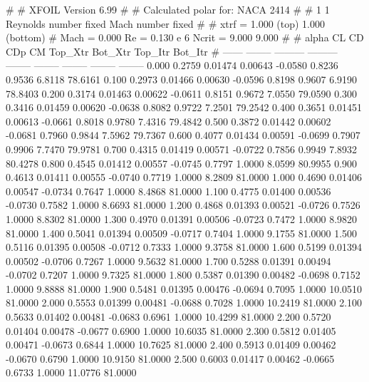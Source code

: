 #  
#       XFOIL         Version 6.99
#  
# Calculated polar for: NACA 2414                                       
#  
# 1 1 Reynolds number fixed          Mach number fixed         
#  
# xtrf =   1.000 (top)        1.000 (bottom)  
# Mach =   0.000     Re =     0.130 e 6     Ncrit =   9.000  9.000
#  
#   alpha    CL        CD       CDp       CM     Top_Xtr  Bot_Xtr  Top_Itr  Bot_Itr
#  ------ -------- --------- --------- -------- -------- -------- -------- --------
   0.000   0.2759   0.01474   0.00643  -0.0580   0.8236   0.9536   6.8118  78.6161
   0.100   0.2973   0.01466   0.00630  -0.0596   0.8198   0.9607   6.9190  78.8403
   0.200   0.3174   0.01463   0.00622  -0.0611   0.8151   0.9672   7.0550  79.0590
   0.300   0.3416   0.01459   0.00620  -0.0638   0.8082   0.9722   7.2501  79.2542
   0.400   0.3651   0.01451   0.00613  -0.0661   0.8018   0.9780   7.4316  79.4842
   0.500   0.3872   0.01442   0.00602  -0.0681   0.7960   0.9844   7.5962  79.7367
   0.600   0.4077   0.01434   0.00591  -0.0699   0.7907   0.9906   7.7470  79.9781
   0.700   0.4315   0.01419   0.00571  -0.0722   0.7856   0.9949   7.8932  80.4278
   0.800   0.4545   0.01412   0.00557  -0.0745   0.7797   1.0000   8.0599  80.9955
   0.900   0.4613   0.01411   0.00555  -0.0740   0.7719   1.0000   8.2809  81.0000
   1.000   0.4690   0.01406   0.00547  -0.0734   0.7647   1.0000   8.4868  81.0000
   1.100   0.4775   0.01400   0.00536  -0.0730   0.7582   1.0000   8.6693  81.0000
   1.200   0.4868   0.01393   0.00521  -0.0726   0.7526   1.0000   8.8302  81.0000
   1.300   0.4970   0.01391   0.00506  -0.0723   0.7472   1.0000   8.9820  81.0000
   1.400   0.5041   0.01394   0.00509  -0.0717   0.7404   1.0000   9.1755  81.0000
   1.500   0.5116   0.01395   0.00508  -0.0712   0.7333   1.0000   9.3758  81.0000
   1.600   0.5199   0.01394   0.00502  -0.0706   0.7267   1.0000   9.5632  81.0000
   1.700   0.5288   0.01391   0.00494  -0.0702   0.7207   1.0000   9.7325  81.0000
   1.800   0.5387   0.01390   0.00482  -0.0698   0.7152   1.0000   9.8888  81.0000
   1.900   0.5481   0.01395   0.00476  -0.0694   0.7095   1.0000  10.0510  81.0000
   2.000   0.5553   0.01399   0.00481  -0.0688   0.7028   1.0000  10.2419  81.0000
   2.100   0.5633   0.01402   0.00481  -0.0683   0.6961   1.0000  10.4299  81.0000
   2.200   0.5720   0.01404   0.00478  -0.0677   0.6900   1.0000  10.6035  81.0000
   2.300   0.5812   0.01405   0.00471  -0.0673   0.6844   1.0000  10.7625  81.0000
   2.400   0.5913   0.01409   0.00462  -0.0670   0.6790   1.0000  10.9150  81.0000
   2.500   0.6003   0.01417   0.00462  -0.0665   0.6733   1.0000  11.0776  81.0000
